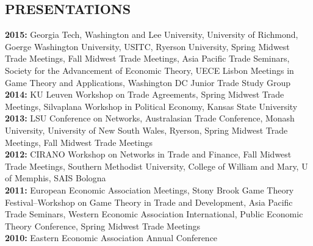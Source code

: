 \documentclass[11pt]{res}
\begin{document}
\begin{resume}
\section{PRESENTATIONS}\vspace{1.5mm}
{\bf 2015:} Georgia Tech, Washington and Lee University, University of Richmond, Goerge Washington University, USITC, Ryerson University, Spring Midwest Trade Meetings, Fall Midwest Trade Meetings, Asia Pacific Trade Seminars, Society for the Advancement of Economic Theory, UECE Lisbon Meetings in Game Theory and Applications, Washington DC Junior Trade Study Group\vspace{1.5mm}\\
{\bf 2014:} KU Leuven Workshop on Trade Agreements, Spring Midwest Trade Meetings, Silvaplana Workshop in Political Economy, Kansas State University\vspace{1.5mm}\\
{\bf 2013:} LSU Conference on Networks, Australasian Trade Conference, Monash University, University of New South Wales, Ryerson, Spring Midwest Trade Meetings, Fall Midwest Trade Meetings\vspace{1.5mm}\\
{\bf 2012:}  CIRANO Workshop on Networks in Trade and Finance, Fall Midwest Trade Meetings, Southern Methodist University, College of William and Mary, U of Memphis, SAIS Bologna\vspace{1.5mm}\\
{\bf 2011:} European Economic Association Meetings, Stony Brook Game Theory Festival--Workshop on Game Theory in Trade and Development, Asia Pacific Trade Seminars, Western Economic Association International, Public Economic Theory Conference, Spring Midwest Trade Meetings\vspace{1.5mm}\\
{\bf 2010:} Eastern Economic Association Annual Conference \vspace{1.5mm}\\



\phantom{.}\vspace{.05cm}

\end{resume}
\end{document}
